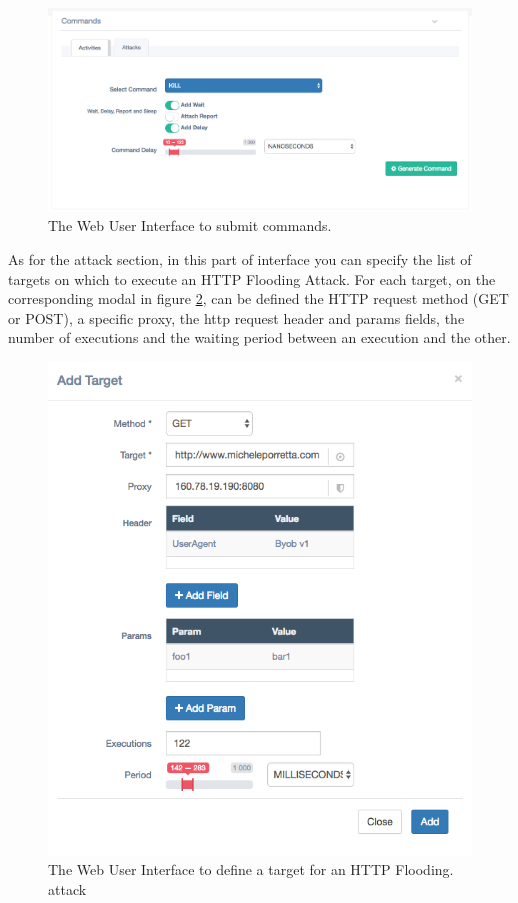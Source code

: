 \begin{figure}[tp]
  \centering
  \includegraphics[scale=0.45]{./fig/commandsWUI.png}
  \caption{The Web User Interface to submit commands.}
    \label{fig:commands-wui}
\end{figure}

As for the attack section, in this part of interface you can specify the list of targets on which to execute an HTTP Flooding Attack. For each target, on the corresponding modal in figure \ref{fig:target-wui}, can be defined the HTTP request method (GET or POST), a specific proxy, the http request header and params fields, the number of executions and the waiting period between an execution and the other.

\begin{figure}[tp]
  \centering
  \includegraphics[scale=0.45]{./fig/targetWUI.png}
  \caption{The Web User Interface to define a target for an HTTP Flooding. attack}
    \label{fig:target-wui}
\end{figure}

